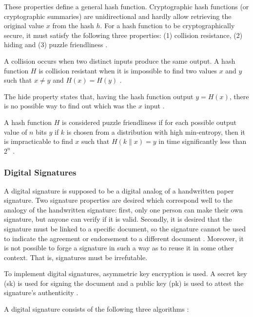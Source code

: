 These properties define a general hash function. Cryptographic hash functions (or cryptographic summaries) are unidirectional and hardly allow retrieving the original value $x$ from the hash $h$. For a hash function to be cryptographically secure, it must satisfy the following three properties: (1) collision resistance, (2) hiding and (3) puzzle friendliness \cite{greve2018blockchain}.

A collision occurs when two distinct inputs produce the same output. A hash function $H$ is collision resistant when it is impossible to find two values $x$ and $y$ such that $x \neq y$ and $H(x) = H(y)$ \cite{narayanan2016bitcoin}.

The hide property states that, having the hash function output $y = H (x)$, there is no possible way to find out which was the $x$ input \cite{greve2018blockchain}.

A hash function $H$ is considered puzzle friendliness if for each possible output value of $n$ bits $y$ if $k$ is chosen from a distribution with high min-entropy, then it is impracticable to find $x$ such that $H (k \| x) = y$ in time significantly less than $2^n$ \cite{narayanan2016bitcoin}.

\subsubsection{Digital Signatures}\label{sec:assinaturasDigitais}
A digital signature is supposed to be a digital analog of a handwritten paper signature. Two signature properties are desired which correspond well to the analogy of the handwritten signature: first, only one person can make their own signature, but anyone can verify if it is valid. Secondly, it is desired that the signature must be linked to a specific document, so the signature cannot be used to indicate the agreement or endorsement to a different document \cite{merkle1989certified}. Moreover, it is not possible to forge a signature in such a way as to reuse it in some other context. That is, signatures must be irrefutable.

To implement digital signatures, asymmetric key encryption is used. A secret key (sk) is used for signing the document and a public key (pk) is used to attest the signature's authenticity \cite{greve2018blockchain}.

A digital signature consists of the following three algorithms \cite{narayanan2016bitcoin}:

